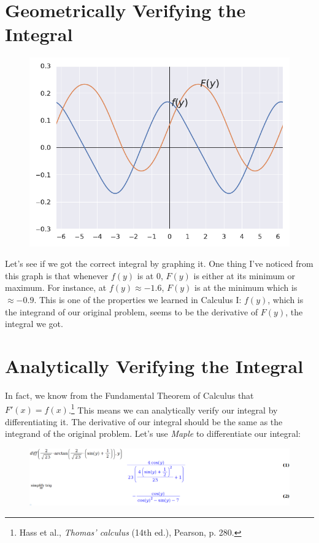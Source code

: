 \section*{Geometrically Verifying the Integral}

\begin{figure}
	\centering
	\caption[Figure 1. The integrand and the integral.]{}
	\includegraphics[width=0.7\linewidth]{graph_1}
	\label{fig:graph1}
\end{figure}

Let's see if we got the correct integral
by graphing it. One thing I've noticed
from this graph is that whenever $ f(y) $ is at $ 0 $, 
$ F(y) $ is either at its minimum or maximum.
For instance, at $ f(y) \approx -1.6 $,
$F(y)$ is at the minimum which is $ \approx -0.9 $.
This is one of the properties we learned
in Calculus I: $ f(y) $, which is the integrand
of our original problem, seems to be the
derivative of $ F(y) $, the integral we got.

\newpage

\section*{Analytically Verifying the Integral}

In fact, we know from the Fundamental Theorem of Calculus
that $ F\prime(x) = f(x) $.\footnote{
	Hass et al., \textit{Thomas' calculus} (14th ed.), Pearson, p. 280.
} This means we can analytically verify our integral by differentiating it. 
The derivative of our integral should be the same as 
the integrand of the original problem.
Let's use \textit{Maple} to
differentiate our integral: 
\begin{figure}
	\centering
	\includegraphics[width=0.98\linewidth]{maple}
	\caption{}
	\label{fig:maple}
\end{figure}

